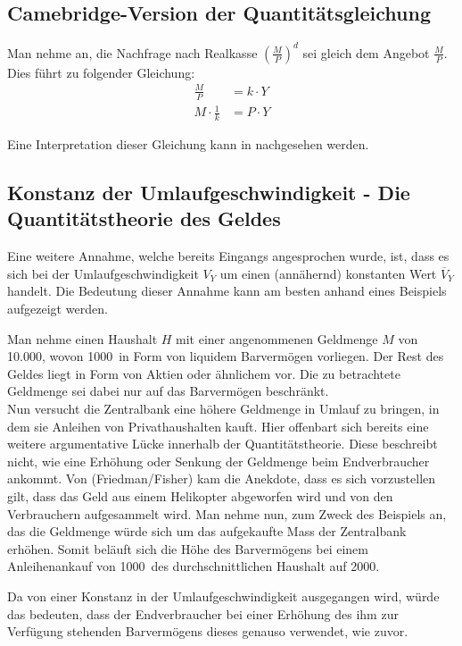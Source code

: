 \subsection{Camebridge-Version der Quantitätsgleichung}

Man nehme an, die Nachfrage nach Realkasse $(\frac{M}{P})^d$ sei gleich dem Angebot $\frac{M}{P}$. Dies führt zu folgender Gleichung:
\begin{align}
    \frac{M}{P} &= k \cdot Y \\
    M \cdot \frac{1}{k} &= P \cdot Y
\end{align}

Eine Interpretation dieser Gleichung kann in \cite[126]{mankiw2017} nachgesehen werden.

\subsection{Konstanz der Umlaufgeschwindigkeit - Die Quantitätstheorie des Geldes}\label{sec:Umlaufgeschwindigkeit}
Eine weitere Annahme, welche bereits Eingangs angesprochen wurde, ist, dass es sich bei der Umlaufgeschwindigkeit $V_Y$ um einen (annähernd) konstanten Wert $\overline{V}_Y$ handelt. Die Bedeutung dieser Annahme kann am besten anhand eines Beispiels aufgezeigt werden.

\begin{example}
    Man nehme einen Haushalt $H$ mit einer angenommenen Geldmenge $M$ von 10.000\EUR, wovon 1000\EUR\ in Form von liquidem Barvermögen vorliegen. Der Rest des Geldes liegt in Form von Aktien oder ähnlichem vor. Die zu betrachtete Geldmenge sei dabei nur auf das Barvermögen beschränkt. \\
    Nun versucht die Zentralbank eine höhere Geldmenge in Umlauf zu bringen, in dem sie Anleihen von Privathaushalten kauft. Hier offenbart sich bereits eine weitere argumentative Lücke innerhalb der Quantitätstheorie. Diese beschreibt nicht, wie eine Erhöhung oder Senkung der Geldmenge beim Endverbraucher ankommt. Von (Friedman/Fisher) kam die Anekdote, dass es sich vorzustellen gilt, dass das Geld aus einem Helikopter abgeworfen wird und von den Verbrauchern aufgesammelt wird. Man nehme nun, zum Zweck des Beispiels an, das die Geldmenge würde sich um das aufgekaufte Mass der Zentralbank erhöhen. Somit beläuft sich die Höhe des Barvermögens bei einem Anleihenankauf von 1000\EUR\, des durchschnittlichen Haushalt auf 2000\EUR. 

    Da von einer Konstanz in der Umlaufgeschwindigkeit ausgegangen wird, würde das bedeuten, dass der Endverbraucher bei einer Erhöhung des ihm zur Verfügung stehenden Barvermögens dieses genauso verwendet, wie zuvor. 
\end{example}\label{Bsp.kUmlauf}

